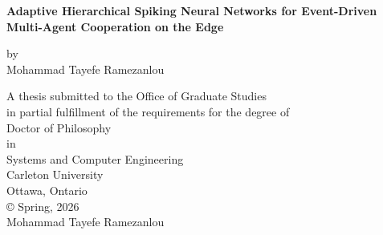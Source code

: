 \begin{titlepage}
\begin{center}
\begin{large}

\vspace*{1cm}
\textbf{Adaptive Hierarchical Spiking Neural Networks for Event-Driven Multi-Agent Cooperation on the Edge}\\
\vspace{0.5cm}

\vspace{1cm}
by\\
\vspace{1cm}
Mohammad Tayefe Ramezanlou\\
\vspace{2cm}
\end{large}
A thesis submitted to the Office of Graduate Studies\\
in partial fulfillment of the requirements for the degree of\\
Doctor of Philosophy\\
in\\
Systems and Computer Engineering\\
\vfill
Carleton University\\
Ottawa, Ontario\\
© Spring, 2026\\
Mohammad Tayefe Ramezanlou
\end{center}
\end{titlepage}
